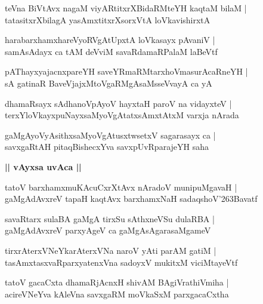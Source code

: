 \documentclass[twoside,12pt,openright]{book}
\def\S{\char'263}
\newcounter{shloka}[chapter]
\def\uvaca#1{\centerline{{\large\textbf{#1}}}}
\begin{document}
\begin{shloka}%
teVna BiVtAvx nagaM viyARtitxrXBidaRMteYH kaqtaM bilaM |\\
tatasitxrXbilagA yasAmxtitxrXsorxVtA loVkavishirxtA 
\end{shloka}

\begin{shloka}%
harabarxhamxhareVyoRVgAtUpxtA loVkasayx pAvaniV |\\
samAsAdayx ca tAM deVviM savaRdamaRPalaM laBeVtf 
\end{shloka}

\begin{shloka}%
pAThayxyajacnxpareYH saveYRmaRMtarxhoVmasurAcaRneYH |\\
sA gatinaR BaveVjajxMtoVgaRMgAsaMsseVvayA ca yA 
\end{shloka}

\begin{shloka}%
dhamaRsayx sAdhanoVpAyoV hayxtaH paroV na vidayxteV |\\
terxYloVkayxpuNayxsaMyoVgAtatxsAmxtAtxM varxja nArada 
\end{shloka}

\begin{shloka}%
gaMgAyoVyAsithxsaMyoVgAtusxtwsetxV sagarasayx ca |\\
savxgaRtAH pitaqBishecxYva savxpUvRparajeYH saha 
\end{shloka}

\uvaca{|| vAyxsa uvAca ||}

\begin{shloka}%
tatoV barxhamxmuKAcuCxrXtAvx nAradoV munipuMgavaH |\\
gaMgAdAvxreV tapaH kaqtAvx barxhamxNaH sadaqshoV\S Bavatf 
\end{shloka}

\begin{shloka}%
savaRtarx sulaBA gaMgA tirxSu sAthxneVSu dulaRBA |\\
gaMgAdAvxreV parxyAgeV ca gaMgAsAgarasaMgameV 
\end{shloka}

\begin{shloka}%
tirxrAterxVNeYkarAterxVNa naroV yAti parAM gatiM |\\
tasAmxtasxvaRparxyatenxVna sadoyxV mukitxM viciMtayeVtf 
\end{shloka}

\begin{shloka}%
tatoV gacaCxta dhamaRjAcnxH shivAM BAgiVrathiVmiha |\\
acireVNeYva kAleVna savxgaRM moVkaSxM parxgacaCxtha 
\end{shloka}
\end{document}
